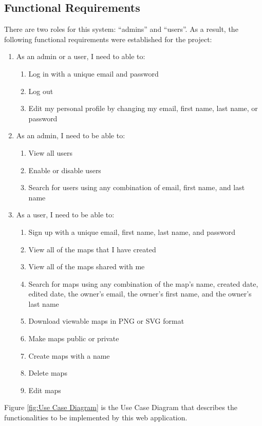 \subsection{Functional Requirements}
\label{sec:Requirements>Functional Requirements}
There are two roles for this system: ``admins'' and ``users''. As a result, the following functional requirements were established for the project:
\begin{enumerate}
  \item As an admin or a user, I need to able to:
  \begin{enumerate}
    \item Log in with a unique email and password
    \item Log out
    \item Edit my personal profile by changing my email, first name, last name, or password
  \end{enumerate}
  \item As an admin, I need to be able to:
  \begin{enumerate}
    \item View all users
    \item Enable or disable users
    \item Search for users using any combination of email, first name, and last name
  \end{enumerate}
  \item As a user, I need to be able to:
  \begin{enumerate}
    \item Sign up with a unique email, first name, last name, and password
    \item View all of the maps that I have created
    \item View all of the maps shared with me
    \item Search for maps using any combination of the map's name, created date, edited date, the owner's email, the owner's first name, and the owner's last name
    \item Download viewable maps in PNG or SVG format
    \item Make maps public or private
    \item Create maps with a name
    \item Delete maps
    \item Edit maps
  \end{enumerate}
\end{enumerate}

Figure \ref{fig:Use Case Diagram} is the Use Case Diagram that describes the functionalities to be implemented by this web application.

